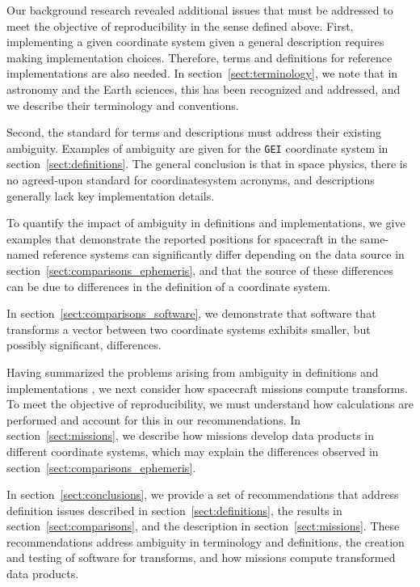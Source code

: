 \documentclass[draft]{agujournal2019}
\begin{document}
Our background research revealed additional issues that must be addressed to meet the objective of reproducibility in the sense defined above. First, implementing a given coordinate system given a general description requires making implementation choices. Therefore, terms and definitions for reference implementations are also needed. In section~\ref{sect:terminology}, we note that in astronomy and the Earth sciences, this has been recognized and addressed, and we describe their terminology and conventions.

Second, the standard for terms and descriptions must address their existing ambiguity. Examples of ambiguity are given for the \texttt{GEI} coordinate system in section~\ref{sect:definitions}. The general conclusion is that in space physics, there is no agreed-upon standard for coordinate\add[a]{-}system acronyms, and descriptions generally lack key implementation details.

To quantify the impact of ambiguity in definitions and implementations, we give examples that demonstrate the reported positions for spacecraft in the same-named reference systems can significantly differ depending on the data source in section~\ref{sect:comparisons_ephemeris}, and that the source of these differences can be due to differences in the definition of a coordinate system. 

In section~\ref{sect:comparisons_software}, we demonstrate that software that transforms a vector between two coordinate systems exhibits smaller, but possibly significant, differences.

Having summarized  the problems arising from ambiguity in definitions and implementations , we next consider how spacecraft missions compute transforms. To meet the objective of reproducibility, we must understand how calculations are performed and account for this in our recommendations. In section~\ref{sect:missions}, we describe how missions develop data products in different coordinate systems, which may explain the differences observed in section~\ref{sect:comparisons_ephemeris}.

In section~\ref{sect:conclusions}, we provide a set of recommendations that address definition issues described in section~\ref{sect:definitions}, the results in section~\ref{sect:comparisons}, and the description in section~\ref{sect:missions}. These recommendations address ambiguity in terminology and definitions, the creation and testing of software for transforms, and how missions compute transformed data products.
\end{document}
